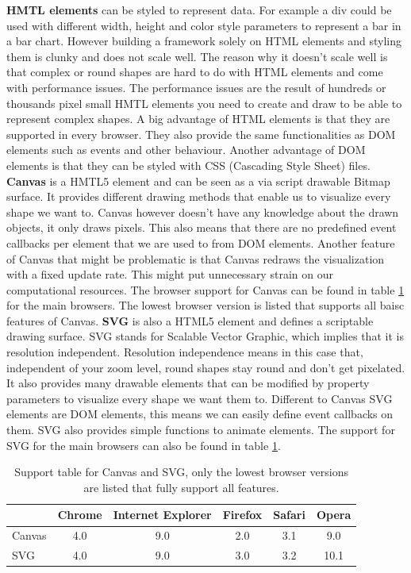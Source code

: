 \documentclass{bioinfo}
\begin{document}
\textbf{HMTL elements} can be styled to represent data. For example a div could be used with different width, height and color style parameters to represent a bar in a bar chart.
However building a framework solely on HTML elements and styling them is clunky and does not scale well.
The reason why it doesn't scale well is that complex or round shapes are hard to do with HTML elements and come with performance issues. The performance issues are the result of hundreds or thousands pixel small HMTL elements you need to create and draw to be able to represent complex shapes.
A big advantage of HTML elements is that they are supported in every browser.
They also provide the same functionalities as DOM elements such as events and other behaviour.
Another advantage of DOM elements is that they can be styled with CSS (Cascading Style Sheet) files.
\newline
\textbf{Canvas} is a HMTL5 element and can be seen as a via script drawable Bitmap surface.
It provides different drawing methods that enable us to visualize every shape we want to.
Canvas however doesn't have any knowledge about the drawn objects, it only draws pixels.
This also means that there are no predefined event callbacks per element that we are used to from DOM elements.
Another feature of Canvas that might be problematic is that Canvas redraws the visualization with a fixed update rate. This might put unnecessary strain on our computational resources.
The browser support for Canvas can be found in table \ref{t:support} for the main browsers. The lowest browser version is listed that supports all baisc features of Canvas.
\newline
\textbf{SVG} is also a HTML5 element and defines a scriptable drawing surface. SVG stands for Scalable Vector Graphic, which implies that it is resolution independent. Resolution independence means in this case that, independent of your zoom level, round shapes stay round and don't get pixelated. 
It also provides many drawable elements that can be modified by property parameters to visualize every shape we want them to. Different to Canvas SVG elements are DOM elements, this means we can easily define event callbacks on them. SVG also provides simple functions to animate elements.
The support for SVG for the main browsers can also be found in table \ref{t:support}.

\begin{table}
\begin{tabular}{ l | c | c | c | c | c } 
		& Chrome & Internet Explorer & Firefox & Safari & Opera \\
\hline
Canvas	& 4.0 & 9.0 & 2.0 &	3.1 & 9.0 \\
SVG		& 4.0 & 9.0 & 3.0 &	3.2 & 10.1 \\
\end{tabular}
\caption{Support table for Canvas and SVG, only the lowest browser versions are listed that fully support all features.} \label{t:support}
\end{table}
\end{document}
